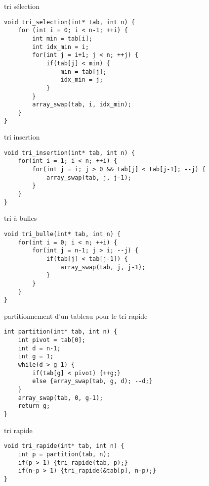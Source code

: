 \begin{imp*}{tri sélection}
\begin{verbatim}
void tri_selection(int* tab, int n) {
    for (int i = 0; i < n-1; ++i) {
        int min = tab[i];
        int idx_min = i;
        for(int j = i+1; j < n; ++j) {
            if(tab[j] < min) {
                min = tab[j];
                idx_min = j;
            }
        }
        array_swap(tab, i, idx_min);
    }
}
\end{verbatim}
\end{imp*}
\begin{imp*}{tri insertion}
\begin{verbatim}
void tri_insertion(int* tab, int n) {
    for(int i = 1; i < n; ++i) {
        for(int j = i; j > 0 && tab[j] < tab[j-1]; --j) {
            array_swap(tab, j, j-1);
        }
    }
}
\end{verbatim}
\end{imp*}
\begin{imp*}{tri à bulles}
\begin{verbatim}
void tri_bulle(int* tab, int n) {
    for(int i = 0; i < n; ++i) {
        for(int j = n-1; j > i; --j) {
            if(tab[j] < tab[j-1]) {
                array_swap(tab, j, j-1);
            }
        }
    }
}
\end{verbatim}
\end{imp*}
\begin{imp*}{partitionnement d'un tableau pour le tri rapide}
\begin{verbatim}
int partition(int* tab, int n) {
    int pivot = tab[0];
    int d = n-1;
    int g = 1;
    while(d > g-1) {
        if(tab[g] < pivot) {++g;}
        else {array_swap(tab, g, d); --d;}
    }
    array_swap(tab, 0, g-1);
    return g;
}
\end{verbatim}
\end{imp*}
\begin{imp*}{tri rapide}
\begin{verbatim}
void tri_rapide(int* tab, int n) {
    int p = partition(tab, n);
    if(p > 1) {tri_rapide(tab, p);}
    if(n-p > 1) {tri_rapide(&tab[p], n-p);}
}
\end{verbatim}
\end{imp*}
